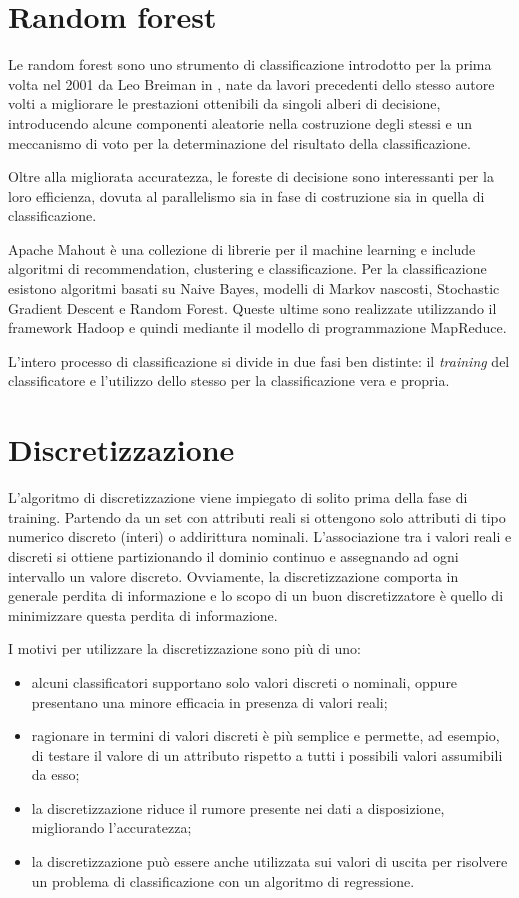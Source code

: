 \documentclass[a4paper,11pt,twoside,openright,fleqn]{book}
\begin{document}
\section{Random forest}

Le random forest sono uno strumento di classificazione introdotto per la prima volta nel 2001 da Leo Breiman in \cite{Breiman:2001}, nate da lavori precedenti dello stesso autore volti a migliorare le prestazioni ottenibili da singoli alberi di decisione, introducendo alcune componenti aleatorie nella costruzione degli stessi e un meccanismo di voto per la determinazione del risultato della classificazione.

Oltre alla migliorata accuratezza, le foreste di decisione sono interessanti per la loro efficienza, dovuta al parallelismo sia in fase di costruzione sia in quella di classificazione.

Apache Mahout è una collezione di librerie per il machine learning e include algoritmi di recommendation, clustering e classificazione. Per la classificazione esistono algoritmi basati su Naive Bayes, modelli di Markov nascosti, Stochastic Gradient Descent e Random Forest. Queste ultime sono realizzate utilizzando il framework Hadoop e quindi mediante il modello di programmazione MapReduce.

L'intero processo di classificazione si divide in due fasi ben distinte: il \emph{training} del classificatore e l'utilizzo dello stesso per la classificazione vera e propria.

\section{Discretizzazione}

L'algoritmo di discretizzazione viene impiegato di solito prima della fase di training. Partendo da un set con attributi reali si ottengono solo attributi di tipo numerico discreto (interi) o addirittura nominali. L'associazione tra i valori reali e discreti si ottiene partizionando il dominio continuo e assegnando ad ogni intervallo un valore discreto. Ovviamente, la discretizzazione comporta in generale perdita di informazione e lo scopo di un buon discretizzatore è quello di minimizzare questa perdita di informazione.

I motivi per utilizzare la discretizzazione sono più di uno:
\begin{itemize}
\item alcuni classificatori supportano solo valori discreti o nominali, oppure presentano una minore efficacia in presenza di valori reali;
\item ragionare in termini di valori discreti è più semplice e permette, ad esempio, di testare il valore di un attributo rispetto a tutti i possibili valori assumibili da esso;
\item la discretizzazione riduce il rumore presente nei dati a disposizione, migliorando l'accuratezza;
\item la discretizzazione può essere anche utilizzata sui valori di uscita per risolvere un problema di classificazione con un algoritmo di regressione.
\end{itemize}
\end{document}
